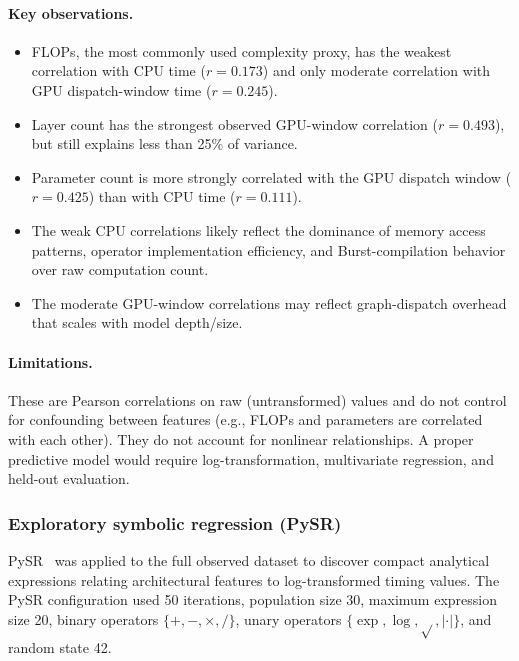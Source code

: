 \documentclass[10pt,twocolumn]{article}
\begin{document}
\paragraph{Key observations.}
\begin{itemize}[nosep,leftmargin=*]
  \item FLOPs, the most commonly used complexity proxy, has the weakest correlation with CPU time ($r = 0.173$) and only moderate correlation with GPU dispatch-window time ($r = 0.245$).
  \item Layer count has the strongest observed GPU-window correlation ($r = 0.493$), but still explains less than 25\% of variance.
  \item Parameter count is more strongly correlated with the GPU dispatch window ($r = 0.425$) than with CPU time ($r = 0.111$).
  \item The weak CPU correlations likely reflect the dominance of memory access patterns, operator implementation efficiency, and Burst-compilation behavior over raw computation count.
  \item The moderate GPU-window correlations may reflect graph-dispatch overhead that scales with model depth/size.
\end{itemize}

\paragraph{Limitations.}
These are Pearson correlations on raw (untransformed) values and do not control for confounding between features (e.g., FLOPs and parameters are correlated with each other). They do not account for nonlinear relationships. A proper predictive model would require log-transformation, multivariate regression, and held-out evaluation.

\CorrelationFigure

\subsubsection{Exploratory symbolic regression (PySR)}

PySR~\cite{cranmer2023pysr} was applied to the full observed dataset to discover compact analytical expressions relating architectural features to log-transformed timing values. The PySR configuration used 50 iterations, population size 30, maximum expression size 20, binary operators $\{+, -, \times, /\}$, unary operators $\{\exp, \log, \sqrt{}, |\cdot|\}$, and random state 42.
\end{document}
